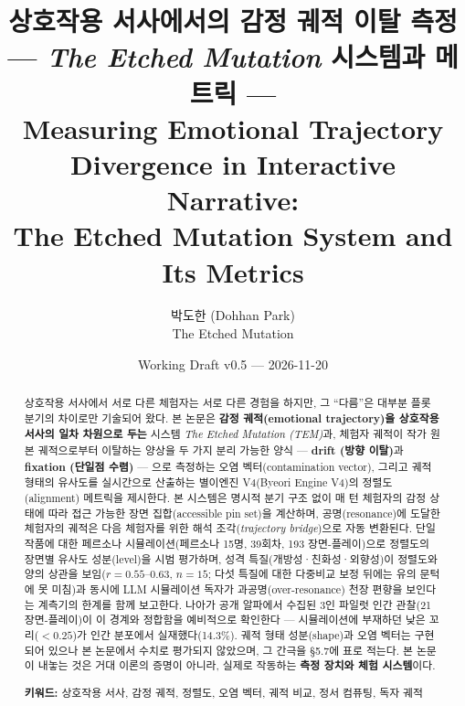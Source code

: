 \documentclass[11pt, a4paper]{article}
\title{%
  상호작용 서사에서의 감정 궤적 이탈 측정\\
  \large --- \textit{The Etched Mutation} 시스템과 메트릭 ---\\[0.8em]
  \normalsize Measuring Emotional Trajectory Divergence in Interactive Narrative:\\
  The Etched Mutation System and Its Metrics
}
\author{박도한 (Dohhan Park)\\ \small The Etched Mutation}
\date{Working Draft v0.5 --- 2026-11-20}
\begin{document}
\maketitle

\begin{abstract}
\noindent 상호작용 서사에서 서로 다른 체험자는 서로 다른 경험을 하지만, 그 ``다름''은 대부분 플롯 분기의 차이로만 기술되어 왔다. 본 논문은 \textbf{감정 궤적(emotional trajectory)을 상호작용 서사의 일차 차원으로 두는} 시스템 \textit{The Etched Mutation (TEM)}과, 체험자 궤적이 작가 원본 궤적으로부터 이탈하는 양상을 두 가지 분리 가능한 양식 --- \textbf{drift (방향 이탈)}과 \textbf{fixation (단일점 수렴)} --- 으로 측정하는 오염 벡터(contamination vector), 그리고 궤적 형태의 유사도를 실시간으로 산출하는 별이엔진 V4(Byeori Engine V4)의 정렬도(alignment) 메트릭을 제시한다. 본 시스템은 명시적 분기 구조 없이 매 턴 체험자의 감정 상태에 따라 접근 가능한 장면 집합(accessible pin set)을 계산하며, 공명(resonance)에 도달한 체험자의 궤적은 다음 체험자를 위한 해석 조각(\textit{trajectory bridge})으로 자동 변환된다. 단일 작품에 대한 페르소나 시뮬레이션(페르소나 15명, 39회차, 193 장면-플레이)으로 정렬도의 장면별 유사도 성분(level)을 시범 평가하며, 성격 특질(개방성·친화성·외향성)이 정렬도와 양의 상관을 보임($r = 0.55$--$0.63$, $n=15$; 다섯 특질에 대한 다중비교 보정 뒤에는 유의 문턱에 못 미침)과 동시에 LLM 시뮬레이션 독자가 과공명(over-resonance) 천장 편향을 보인다는 계측기의 한계를 함께 보고한다. 나아가 공개 알파에서 수집된 3인 파일럿 인간 관찰(21 장면-플레이)이 이 경계와 정합함을 예비적으로 확인한다 --- 시뮬레이션에 부재하던 낮은 꼬리($<0.25$)가 인간 분포에서 실재했다(14.3\%). 궤적 형태 성분(shape)과 오염 벡터는 구현되어 있으나 본 논문에서 수치로 평가되지 않았으며, 그 간극을 \S5.7에 표로 적는다. 본 논문이 내놓는 것은 거대 이론의 증명이 아니라, 실제로 작동하는 \textbf{측정 장치와 체험 시스템}이다.

\medskip
\noindent\textbf{키워드:} 상호작용 서사, 감정 궤적, 정렬도, 오염 벡터, 궤적 비교, 정서 컴퓨팅, 독자 궤적
\end{abstract}

\medskip
{}
\end{document}

